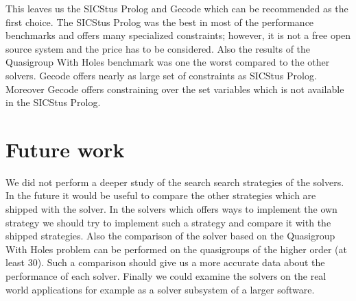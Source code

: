 This leaves us the SICStus Prolog and Gecode which can be recommended as the first
choice. The SICStus Prolog was the best in most of the performance benchmarks and offers 
many specialized constraints; however, it is not a free open source system and
the price has to be considered. Also the results of the Quasigroup With Holes benchmark
was one the worst compared to the other solvers. Gecode offers nearly as large set of constraints
as SICStus Prolog. Moreover Gecode offers constraining over the set variables which
is not available in the SICStus Prolog.

\section{Future work}
We did not perform a deeper study of the search search strategies of
the solvers. In the future it would be useful to compare the other strategies which are shipped
with the solver. In the solvers which offers ways to implement the own strategy we 
should try to implement such a strategy and compare it with the shipped strategies.
Also the comparison of the solver based on the Quasigroup With Holes problem can
be performed on the quasigroups of the higher order (at least 30). Such a comparison 
should give us a more accurate data about the performance of each solver.
Finally we could examine the solvers on the real world applications for example
as a solver subsystem of a larger software. 